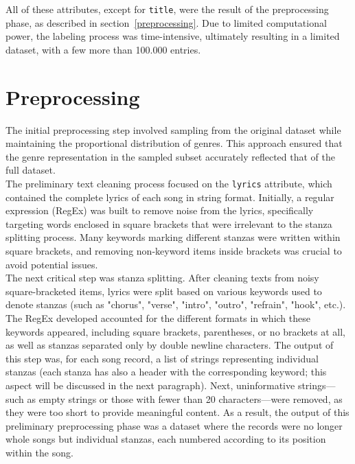 All of these attributes, except for \texttt{title}, were the result
of the preprocessing phase, as described in section~\ref{preprocessing}.
Due to limited computational power, the labeling process was time-intensive,
ultimately resulting in a limited dataset, with a few more than 100.000 entries.

\section*{Preprocessing}
\label{preprocessing}
The initial preprocessing step involved sampling from the original dataset
while maintaining the proportional distribution of genres.
This approach ensured that the genre representation in the sampled subset
accurately reflected that of the full dataset.\\

The preliminary text cleaning process focused on the \texttt{lyrics} attribute,
which contained the complete lyrics of each song in string format.
Initially, a regular expression (RegEx) was built to remove noise from the
lyrics, specifically targeting words enclosed in square brackets that were
irrelevant to the stanza splitting process. Many keywords marking different
stanzas were written within square brackets, and removing non-keyword items
inside brackets was crucial to avoid potential issues.\\

The next critical step was stanza splitting. After cleaning texts from
noisy square-bracketed items, lyrics were split based on various keywords
used to denote stanzas (such as "chorus", "verse", "intro", "outro", "refrain", "hook", etc.).
The RegEx developed accounted for the different formats in which these keywords
appeared, including square brackets, parentheses, or no brackets at all, as well
as stanzas separated only by double newline characters.
The output of this step was, for each song record, a list of strings
representing individual stanzas (each stanza has also a header with the corresponding
keyword; this aspect will be discussed in the next paragraph).
Next, uninformative strings—such as empty strings or those with fewer
than 20 characters—were removed, as they were too short to provide meaningful
content.
As a result, the output of this preliminary preprocessing phase was a dataset
where the records were no longer whole songs but individual stanzas, each
numbered according to its position within the song.\\

